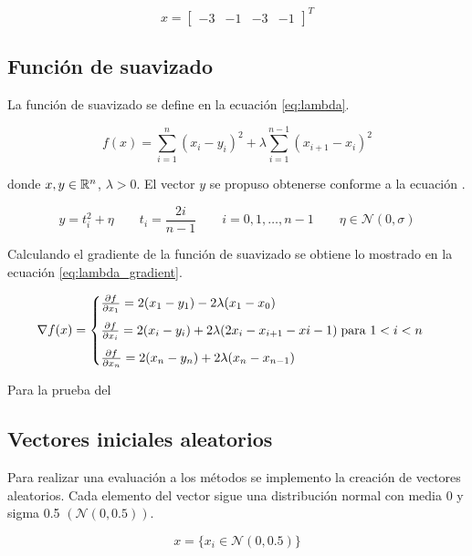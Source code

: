 \begin{equation}
    x = \begin{bmatrix}
        -3 & -1 & -3 & -1
    \end{bmatrix}^T \label{eq:wood_vector}
\end{equation}

\subsection{Función de suavizado}


La función de suavizado se define en la ecuación \ref{eq:lambda}.

\begin{equation}
    f(x) = \sum_{i=1}^n (x_i-y_i)^2 + \lambda \sum_{i=1}^{n-1} (x_{i+1}-x_i)^2 \label{eq:lambda}
\end{equation}


donde $x,y\in \mathbb{R}^n$, $\lambda >0$. El vector $y$ se propuso obtenerse conforme a la ecuación .

\begin{equation}
    y = t_i^2 + \eta \qquad t_i = \frac{2i}{n-1} \qquad i=0,1,\dots,n-1 \qquad \eta \in \mathcal{N}(0,\sigma)
\end{equation}

Calculando el gradiente de la función de suavizado se obtiene lo mostrado en la ecuación \ref{eq:lambda_gradient}.

\begin{equation}
    \nabla f(x) = \begin{cases}
        \frac{\partial f}{\partial x_1} = 2(x_1-y_1)-2\lambda (x_1-x_0)                                 \\[0.25cm]
        \frac{\partial f}{\partial x_i} = 2(x_i-y_i)+2\lambda(2x_i-x_{i+1}-x{i-1}) \;\text{para } 1<i<n \\[0.25cm]
        \frac{\partial f}{\partial x_n} = 2(x_n-y_n) + 2\lambda(x_n-x_{n-1})
    \end{cases} \label{eq:lambda_gradient}
\end{equation}

Para la prueba del

\subsection{Vectores iniciales aleatorios}

Para realizar una evaluación a los métodos se implemento la creación de vectores aleatorios. Cada elemento del vector sigue una distribución normal con media 0 y sigma 0.5 $(\mathcal{N}(0,0.5))$.

\begin{equation}
    x = \{ x_i \in \mathcal{N}(0,0.5)\} \label{eq:random_vector}
\end{equation}